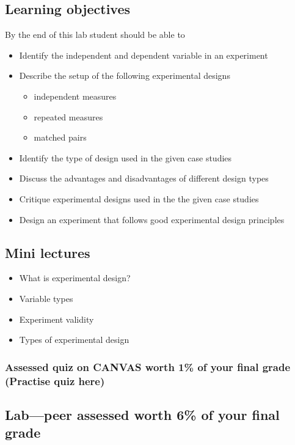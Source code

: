 \documentclass{article}
\begin{document}
\subsection*{Learning objectives}
By the end of this lab student should be able to
\begin{itemize}
  \item Identify the independent and dependent variable in an experiment
\item Describe the setup of the following experimental designs
  \begin{itemize}
  \item independent measures
  \item repeated measures
  \item matched pairs
  \end{itemize}
\item Identify the type of design used in the given case studies
\item Discuss the advantages and disadvantages of different design types
\item Critique experimental designs used in the the given case studies
\item Design an experiment that follows good experimental design principles
\end{itemize}

\subsection*{Mini lectures}

\begin{itemize}
\item What is experimental design?
\item Variable types
\item Experiment validity
\item Types of experimental design
\end{itemize}

\subsubsection*{Assessed quiz on CANVAS worth 1\% of your final grade (Practise quiz here)}

\subsection*{Lab---peer assessed worth 6\% of your final grade}
\end{document}
